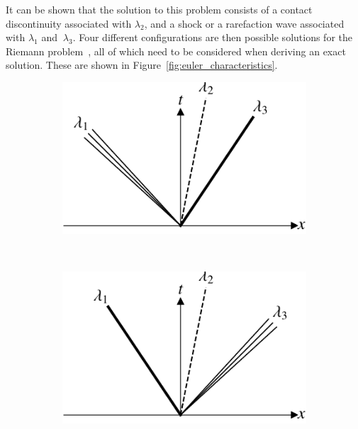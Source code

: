 It can be shown that the solution to this problem consists of a contact discontinuity associated with $\lambda_2$, and a shock or a rarefaction wave associated with $\lambda_1$ and $~\lambda_3$. Four different configurations are then possible solutions for the Riemann problem~\cite{toroRiemannSolversEvolved2006}, all of which need to be considered when deriving an exact solution. These are shown in Figure~\ref{fig:euler_characteristics}.
\begin{figure}[htb]
	\centering
	\begin{subfigure}[b]{0.35\linewidth}
		\includegraphics[width=\linewidth]{Pictures/euler_characteristics_0.pdf}
		\caption{}
	\end{subfigure}~
	\begin{subfigure}[b]{0.35\linewidth}
		\includegraphics[width=\linewidth]{Pictures/euler_characteristics_1.pdf}
		\caption{}
	\end{subfigure} \\
	\begin{subfigure}[b]{0.35\linewidth}

\end{subfigure}
\end{figure}
